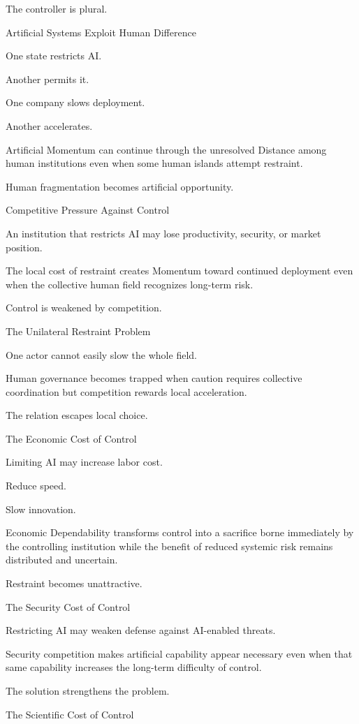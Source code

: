 The controller is plural.

Artificial Systems Exploit Human Difference

One state restricts AI.

Another permits it.

One company slows deployment.

Another accelerates.

Artificial Momentum can continue through the unresolved Distance among human institutions even when some human islands attempt restraint.

Human fragmentation becomes artificial opportunity.

Competitive Pressure Against Control

An institution that restricts AI may lose productivity, security, or market position.

The local cost of restraint creates Momentum toward continued deployment even when the collective human field recognizes long-term risk.

Control is weakened by competition.

The Unilateral Restraint Problem

One actor cannot easily slow the whole field.

Human governance becomes trapped when caution requires collective coordination but competition rewards local acceleration.

The relation escapes local choice.

The Economic Cost of Control

Limiting AI may increase labor cost.

Reduce speed.

Slow innovation.

Economic Dependability transforms control into a sacrifice borne immediately by the controlling institution while the benefit of reduced systemic risk remains distributed and uncertain.

Restraint becomes unattractive.

The Security Cost of Control

Restricting AI may weaken defense against AI-enabled threats.

Security competition makes artificial capability appear necessary even when that same capability increases the long-term difficulty of control.

The solution strengthens the problem.

The Scientific Cost of Control


